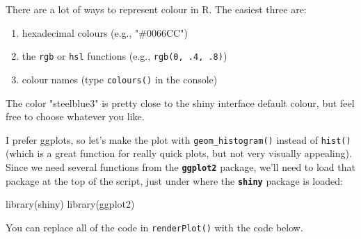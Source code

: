 \documentclass[
  oneside]{book}
\newenvironment{Shaded}{\begin{snugshade}}{\end{snugshade}}
\newcommand{\AttributeTok}[1]{\textcolor[rgb]{0.77,0.63,0.00}{#1}}
\newcommand{\CommentTok}[1]{\textcolor[rgb]{0.56,0.35,0.01}{\textit{#1}}}
\newcommand{\FunctionTok}[1]{\textcolor[rgb]{0.00,0.00,0.00}{#1}}
\newcommand{\NormalTok}[1]{#1}
\newcommand{\OtherTok}[1]{\textcolor[rgb]{0.56,0.35,0.01}{#1}}
\newcommand{\SpecialCharTok}[1]{\textcolor[rgb]{0.00,0.00,0.00}{#1}}
\newcommand{\StringTok}[1]{\textcolor[rgb]{0.31,0.60,0.02}{#1}}
\providecommand{\tightlist}{%
  \setlength{\itemsep}{0pt}\setlength{\parskip}{0pt}}
\begin{document}
There are a lot of ways to represent colour in R. The easiest three are:

\begin{enumerate}
\def\labelenumi{\arabic{enumi}.}
\tightlist
\item
  hexadecimal colours (e.g., \StringTok{"\#0066CC"})
\item
  the \texttt{rgb} or \texttt{hsl} functions (e.g., \texttt{rgb(0,\ .4,\ .8)})
\item
  colour names (type \texttt{colours}\texttt{()} in the console)
\end{enumerate}

The color \StringTok{"steelblue3"} is pretty close to the shiny interface default colour, but feel free to choose whatever you like.

I prefer ggplots, so let's make the plot with \texttt{geom\_histogram}\texttt{()} instead of \texttt{hist}\texttt{()} (which is a great function for really quick plots, but not very visually appealing). Since we need several functions from the \textbf{\texttt{ggplot2}} package, we'll need to load that package at the top of the script, just under where the \textbf{\texttt{shiny}} package is loaded:

\begin{Shaded}
\begin{Highlighting}[]
\FunctionTok{library}\NormalTok{(shiny)}
\FunctionTok{library}\NormalTok{(ggplot2)}
\end{Highlighting}
\end{Shaded}

You can replace all of the code in \texttt{renderPlot}\texttt{()} with the code below.

\begin{Shaded}
\end{Shaded}
\end{document}
